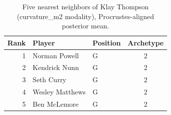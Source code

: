 \begin{table}[htbp]
  \centering\small
  \begin{tabular}{rllc}
    \toprule
    Rank & Player & Position & Archetype \\
    \midrule
    1 & Norman Powell & G & 2 \\
    2 & Kendrick Nunn & G & 2 \\
    3 & Seth Curry & G & 2 \\
    4 & Wesley Matthews & G & 2 \\
    5 & Ben McLemore & G & 2 \\
    \bottomrule
  \end{tabular}
  \caption{Five nearest neighbors of Klay Thompson (curvature_m2 modality), Procrustes-aligned posterior mean.}
  \label{tab:Klay_Thompson_neighbors_curvature_m2}
\end{table}

